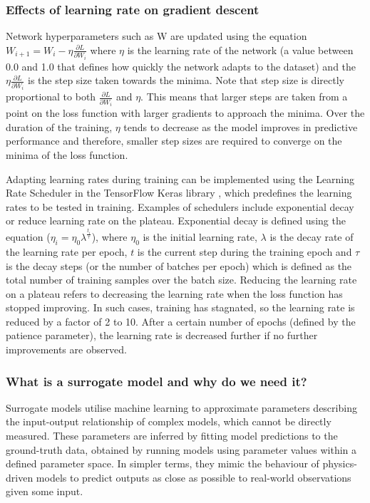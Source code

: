 \documentclass[11pt]{article}
\begin{document}
\subsubsection{Effects of learning rate on gradient descent}
Network hyperparameters such as W are updated using the equation $W_{i+1} = W_{i} - \eta \frac{\partial L}{\partial W_{i}}$ where $\eta$ is the learning rate of the network (a value between 0.0 and 1.0 that defines how quickly the network adapts to the dataset) and the $\eta \frac{\partial L}{\partial W_{i}}$ is the step size taken towards the minima. Note that step size is directly proportional to both $\frac{\partial L}{\partial W_{i}}$ and $\eta$. This means that larger steps are taken from a point on the loss function with larger gradients to approach the minima. Over the duration of the training, $\eta$ tends to decrease as the model improves in predictive performance and therefore, smaller step sizes are required to converge on the minima of the loss function. 

Adapting learning rates during training can be implemented using the Learning Rate Scheduler in the TensorFlow Keras library \cite{abadi_tensorflow_2016}, which predefines the learning rates to be tested in training. Examples of schedulers include exponential decay or reduce learning rate on the plateau. Exponential decay is defined using the equation ($\eta_{i} = \eta_{0} \lambda^{\frac{t_{i}}{\tau}}$), where $\eta_{0}$ is the initial learning rate, $\lambda$ is the decay rate of the learning rate per epoch,  $t$ is the current step during the training epoch and $\tau$ is the decay steps (or the number of batches per epoch) which is defined as the total number of training samples over the batch size. Reducing the learning rate on a plateau refers to decreasing the learning rate when the loss function has stopped improving. In such cases, training has stagnated, so the learning rate is reduced by a factor of 2 to 10. After a certain number of epochs (defined by the patience parameter), the learning rate is decreased further if no further improvements are observed.

\subsubsection{What is a surrogate model and why do we need it?}
 Surrogate models utilise machine learning to approximate parameters describing the input-output relationship of complex models, which cannot be directly measured. These parameters are inferred by fitting model predictions to the ground-truth data, obtained by running models using parameter values within a defined parameter space. In simpler terms, they mimic the behaviour of physics-driven models to predict outputs as close as possible to real-world observations given some input. 
 
\end{document}
